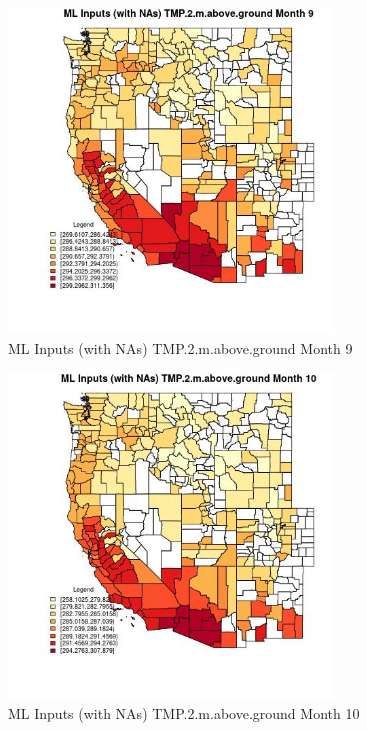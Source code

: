 \begin{figure} 
\centering  
\includegraphics[width=0.77\textwidth]{Code_Outputs/Report_ML_input_PM25_Step4_part_e_de_duplicated_aves_compiled_2019-05-21wNAs_CountyTMP2mabovegroundmedianMonth9.jpg} 
\caption{\label{fig:Report_ML_input_PM25_Step4_part_e_de_duplicated_aves_compiled_2019-05-21wNAsCountyTMP2mabovegroundmedianMonth9}ML Inputs (with NAs) TMP.2.m.above.ground Month 9} 
\end{figure} 
 

\begin{figure} 
\centering  
\includegraphics[width=0.77\textwidth]{Code_Outputs/Report_ML_input_PM25_Step4_part_e_de_duplicated_aves_compiled_2019-05-21wNAs_CountyTMP2mabovegroundmedianMonth10.jpg} 
\caption{\label{fig:Report_ML_input_PM25_Step4_part_e_de_duplicated_aves_compiled_2019-05-21wNAsCountyTMP2mabovegroundmedianMonth10}ML Inputs (with NAs) TMP.2.m.above.ground Month 10} 
\end{figure} 
 


